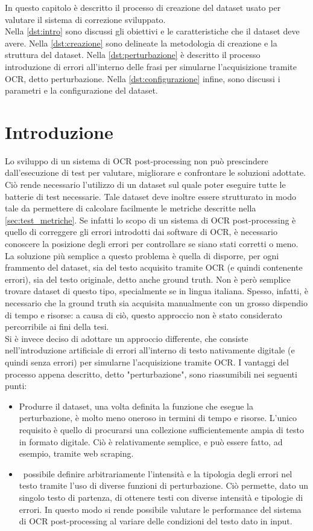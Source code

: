 In questo capitolo è descritto il processo di creazione del dataset usato per valutare il sistema di correzione sviluppato.\\
Nella \autoref{dst:intro} sono discussi gli obiettivi e le caratteristiche che il dataset deve avere. Nella \autoref{dst:creazione} sono delineate la metodologia di creazione e la struttura del dataset. Nella \autoref{dst:perturbazione} è descritto il processo introduzione di errori all'interno delle frasi per simularne l'acquisizione tramite OCR, detto perturbazione. Nella \autoref{dst:configurazione} infine, sono discussi i parametri e la configurazione del dataset.
\section{Introduzione}
\label{dst:intro}
Lo sviluppo di un sistema di OCR post-processing non può prescindere dall'esecuzione di test per valutare, migliorare e confrontare le soluzioni adottate. Ciò rende necessario l'utilizzo di un dataset sul quale poter eseguire tutte le batterie di test necessarie. Tale dataset deve inoltre essere strutturato in modo tale da permettere di calcolare facilmente le metriche descritte nella \autoref{sec:test_metriche}. Se infatti lo scopo di un sistema di OCR post-processing è quello di correggere gli errori introdotti dai software di OCR, è necessario conoscere la posizione degli errori per controllare se siano stati corretti o meno.\\
La soluzione più semplice a questo problema è quella di disporre, per ogni frammento del dataset, sia del testo acquisito tramite OCR (e quindi contenente errori), sia del testo originale, detto anche ground truth. Non è però semplice trovare dataset di questo tipo, specialmente se in lingua italiana. Spesso, infatti, è necessario che la ground truth sia acquisita manualmente con un grosso dispendio di tempo e risorse: a causa di ciò, questo approccio non è stato considerato percorribile ai fini della tesi.\\
Si è invece deciso di adottare un approccio differente, che consiste nell'introduzione artificiale di errori all'interno di testo nativamente digitale (e quindi senza errori) per simularne l'acquisizione tramite OCR. I vantaggi del processo appena descritto, detto "perturbazione", sono riassumibili nei seguenti punti:
\begin{itemize}
 \item Produrre il dataset, una volta definita la funzione che esegue la perturbazione, è molto meno oneroso in termini di tempo e risorse. L'unico requisito è quello di procurarsi una collezione sufficientemente ampia di testo in formato digitale. Ciò è relativamente semplice, e può essere fatto, ad esempio, tramite web scraping. 
 \item \E\ possibile definire arbitrariamente l'intensità e la tipologia degli errori nel testo tramite l'uso di diverse funzioni di perturbazione. Ciò permette, dato un singolo testo di partenza, di ottenere testi con diverse intensità e tipologie di errori. In questo modo si rende possibile valutare le performance del sistema di OCR post-processing al variare delle condizioni del testo dato in input.
\end{itemize}

